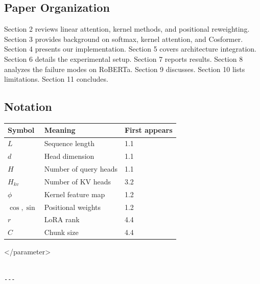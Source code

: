 \subsection{Paper Organization}

Section 2 reviews linear attention, kernel methods, and positional 
reweighting. Section 3 provides background on softmax, kernel attention, 
and Cosformer. Section 4 presents our implementation. Section 5 covers 
architecture integration. Section 6 details the experimental setup. 
Section 7 reports results. Section 8 analyzes the failure modes on 
RoBERTa. Section 9 discusses. Section 10 lists limitations. Section 11 
concludes.



\subsection{Notation}

\begin{table}[H]
\centering
\small
\begin{tabular}{lll}
\toprule
\textbf{Symbol} & \textbf{Meaning} & \textbf{First appears} \\
\midrule
$L$ & Sequence length & 1.1 \\
$d$ & Head dimension & 1.1 \\
$H$ & Number of query heads & 1.1 \\
$H_{kv}$ & Number of KV heads & 3.2 \\
$\phi$ & Kernel feature map & 1.2 \\
$\cos, \sin$ & Positional weights & 1.2 \\
$r$ & LoRA rank & 4.4 \\
$C$ & Chunk size & 4.4 \\
\bottomrule
\end{tabular}
\end{table}
\textless{}/parameter\textgreater{}
\begin{lstlisting}

---
\end{lstlisting}